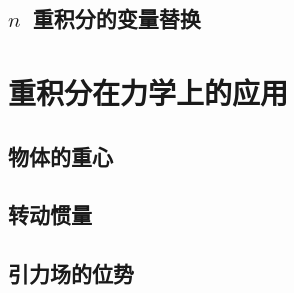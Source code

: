 \subsection{$n$~重积分的变量替换}
\begin{exercise}

\end{exercise}
\section{重积分在力学上的应用}
\subsection{物体的重心}
\subsection{转动惯量}
\subsection{引力场的位势}
\begin{exercise}

\end{exercise}
\begin{exercise*}

\end{exercise*}




\endinput
